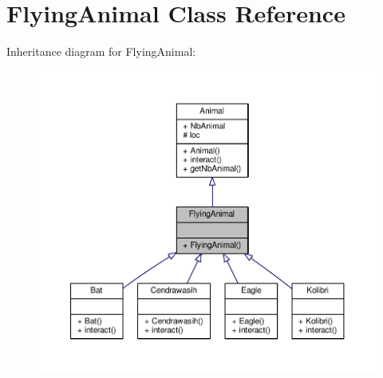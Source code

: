 \hypertarget{classFlyingAnimal}{}\section{Flying\+Animal Class Reference}
\label{classFlyingAnimal}


Inheritance diagram for Flying\+Animal\+:
\nopagebreak
\begin{figure}[H]
\begin{center}
\leavevmode
\includegraphics[width=350pt]{classFlyingAnimal__inherit__graph}
\end{center}
\end{figure}


